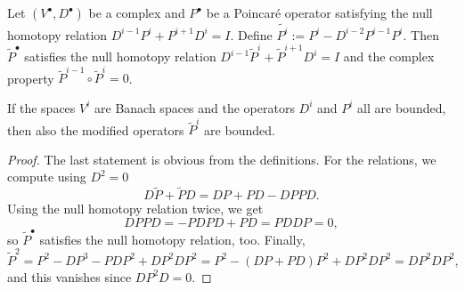 \documentclass[10pt,a4paper]{amsart}
\newcommand{\bs}{{\scriptscriptstyle \bullet}}
\begin{document}
   \begin{theorem}\label{thm:complex}
     Let $(V^{\bs}, D^{\bs})$ be a complex and $P^{\bs}$ be a Poincar\'e operator satisfying the null homotopy relation $D^{i-1}P^{i}+P^{i+1}D^{i}=I$. Define $\tilde{  P^i}:=  P^i-   {D^{i-2}} P^{i-1}P^i$. Then $\tilde P^\bs$ satisfies the null homotopy relation  $D^{i-1}\tilde{P}^i+\tilde{P}^{i+1} D^i=I$ and the complex property $\tilde P^{i-1}\circ \tilde P^i=0$.

     If the spaces $V^i$ are Banach spaces and the operators $D^i$ and $P^i$ all are bounded, then also the modified operators $\tilde P^i$ are bounded. 
   \end{theorem} 

   \begin{proof}
     The last statement is obvious from the definitions. For the relations, we compute using $D^2=0$ 
{ 
$$
  D\tilde P+\tilde PD = DP+PD-DPPD.
$$}
Using the null homotopy relation twice, we get
{ 
$$
 DPPD=-PDPD+PD=PDDP=0,
 $$}
 so $\tilde P^\bs$ satisfies the null homotopy relation, too. Finally, 
$$
 \tilde P^2= P^{2}- D P^{3}- P D P^{2}+ D P^{2}D P^{2}= P^{2}-( D P+ P D) P^{2}+
 D P^{2} D P^{2}= D P^{2} D P^{2}, 
$$
and this vanishes since $ D P^{2} D=0$.
\end{proof}
\end{document}
